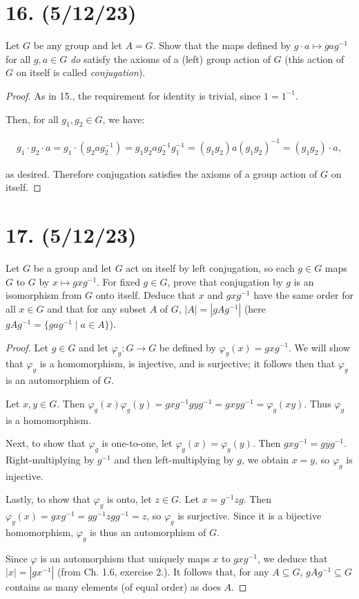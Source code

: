 \documentclass{article}
\begin{document}
\section*{16. (5/12/23)}

Let $G$ be any group and let $A = G$. Show that the maps defined by $g \cdot a \mapsto gag^{-1}$ for all $g, a \in G$ \emph{do} satisfy the axioms of a (left) group action of $G$ (this action of $G$ on itself is called \emph{conjugation}).

\begin{proof}
  As in 15., the requirement for identity is trivial, since $1 = 1^{-1}$.

  Then, for all $g_1, g_2 \in G$, we have:

  \begin{multline*}
    g_1 \cdot g_2 \cdot a = g_1 \cdot (g_2 a g_2^{-1}) = g_1 g_2 a g_2^{-1} g_1^{-1} = (g_1 g_2) a (g_1 g_2)^{-1} = (g_1 g_2) \cdot a,
  \end{multline*}

  as desired. Therefore conjugation satisfies the axioms of a group action of $G$ on itself.
\end{proof}

\section*{17. (5/12/23)}

Let $G$ be a group and let $G$ act on itself by left conjugation, so each $g \in G$ maps $G$ to $G$ by $x \mapsto gxg^{-1}$. For fixed $g \in G$, prove that conjugation by $g$ is an isomorphism from $G$ onto itself. Deduce that $x$ and $gxg^{-1}$ have the same order for all $x \in G$ and that for any subset $A$ of $G$, $|A| = |gAg^{-1}|$ (here $gAg^{-1} = \{ gag^{-1} \mid a \in A \}$).

\begin{proof}
  Let $g \in G$ and let $\varphi_g: G \rightarrow G$ be defined by $\varphi_g(x) = gxg^{-1}$. We will show that $\varphi_g$ is a homomorphism, is injective, and is surjective; it follows then that $\varphi_g$ is an automorphism of $G$.

  Let $x, y \in G$. Then $\varphi_g(x) \varphi_g(y) = gxg^{-1}gyg^{-1} = gxyg^{-1} = \varphi_g(xy)$. Thus $\varphi_g$ is a homomorphism.

  Next, to show that $\varphi_g$ is one-to-one, let $\varphi_g(x) = \varphi_g(y)$. Then $gxg^{-1} = gyg^{-1}$. Right-multiplying by $g^{-1}$ and then left-multiplying by $g$, we obtain $x = y$, so $\varphi_g$ is injective.

  Lastly, to show that $\varphi_g$ is onto, let $z \in G$. Let $x = g^{-1}zg$. Then $\varphi_g(x) = gxg^{-1} = gg^{-1}zgg^{-1} = z$, so $\varphi_g$ is surjective. Since it is a bijective homomorphism, $\varphi_g$ is thus an automorphism of $G$.

  Since $\varphi$ is an automorphism that uniquely maps $x$ to $gxg^{-1}$, we deduce that $|x| = |gx^{-1}|$ (from Ch. 1.6, exercise 2.). It follows that, for any $A \subseteq G$, $gAg^{-1} \subseteq G$ contains as many elements (of equal order) as does $A$.
\end{proof}
\end{document}
